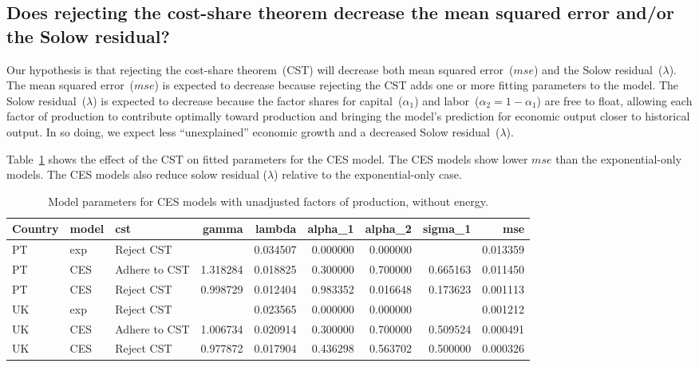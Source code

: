 \documentclass[preprint,authoryear,12pt]{elsarticle}\usepackage[]{graphicx}\usepackage[]{color}
\begin{document}
\subsection{Does rejecting the cost-share theorem 
            decrease the mean squared error and/or the Solow residual?} 
\label{sec:cst_and_solow_residual}

Our hypothesis is that rejecting the cost-share theorem~(CST) will decrease
both mean squared error~($mse$) and
the Solow residual~($\lambda$).
The mean squared error~($mse$) is expected to decrease 
because rejecting the CST adds one or more fitting parameters
to the model.
The Solow residual~($\lambda$) is expected to decrease 
because the factor shares for capital~($\alpha_1$) and labor~($\alpha_2 = 1 - \alpha_1$)
are free to float, 
allowing each factor of production 
to contribute optimally toward production and
bringing the model's prediction for economic output closer to 
historical output. 
In so doing, we expect less ``unexplained'' economic growth 
and a decreased Solow residual~($\lambda$).

Table~\ref{tab:Effect_of_CST_CES} shows the effect of the CST 
on fitted parameters for the CES model.
The CES models show lower $mse$ than the exponential-only models.
The CES models also reduce solow residual ($\lambda$) relative
to the exponential-only case.
%
\begin{table}[ht]
\centering
\caption{Model parameters for CES models with unadjusted factors of production, without energy.} 
\label{tab:Effect_of_CST_CES}
{\tiny
\begin{tabular}{lllrrrrrr}
  \hline
Country & model & cst & gamma & lambda & alpha\_1 & alpha\_2 & sigma\_1 & mse \\ 
  \hline
PT & exp & Reject CST &  & 0.034507 & 0.000000 & 0.000000 &  & 0.013359 \\ 
  PT & CES & Adhere to CST & 1.318284 & 0.018825 & 0.300000 & 0.700000 & 0.665163 & 0.011450 \\ 
  PT & CES & Reject CST & 0.998729 & 0.012404 & 0.983352 & 0.016648 & 0.173623 & 0.001113 \\ 
  UK & exp & Reject CST &  & 0.023565 & 0.000000 & 0.000000 &  & 0.001212 \\ 
  UK & CES & Adhere to CST & 1.006734 & 0.020914 & 0.300000 & 0.700000 & 0.509524 & 0.000491 \\ 
  UK & CES & Reject CST & 0.977872 & 0.017904 & 0.436298 & 0.563702 & 0.500000 & 0.000326 \\ 
   \hline
\end{tabular}
}
\end{table}
\end{document}
